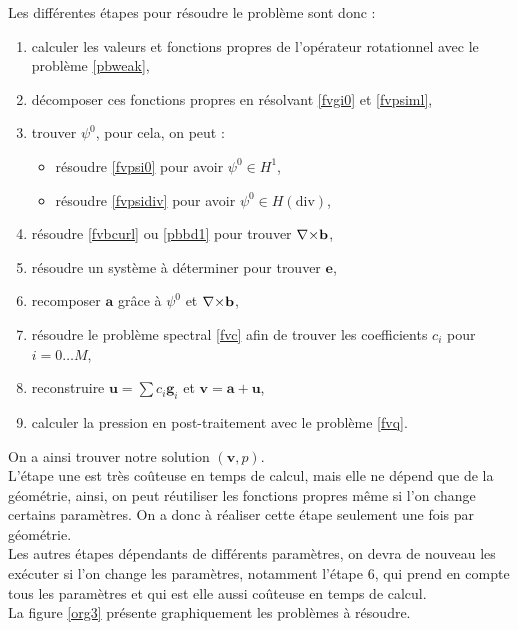 Les différentes étapes pour résoudre le problème sont donc :
\begin{enumerate}
\item calculer les valeurs et fonctions propres de l'opérateur rotationnel avec le problème \ref{pbweak},
\item décomposer ces fonctions propres en résolvant \ref{fvgi0} et \ref{fvpsiml},
\item trouver $\psi^0$, pour cela, on peut :
  \begin{itemize}
  \item résoudre \ref{fvpsi0} pour avoir $\psi^0\in H^1$,
  \item résoudre \ref{fvpsidiv} pour avoir $\psi^0\in H(\mathrm{div})$,
  \end{itemize}
\item résoudre \ref{fvbcurl} ou \ref{pbbd1} pour trouver ${\nabla\times}\mathbf{b}$,
\item résoudre un système à déterminer pour trouver $\mathbf{e}$,
\item recomposer $\mathbf{a}$ grâce à $\psi^0$ et ${\nabla\times}\mathbf{b}$,
\item résoudre le problème spectral \ref{fvc} afin de trouver les coefficients $c_i$ pour $i=0\dots M$,
\item reconstruire $\mathbf{u}=\sum c_i \mathbf{g}_i$ et $\mathbf{v}=\mathbf{a}+\mathbf{u}$,
\item calculer la pression en post-traitement avec le problème \ref{fvq}.
\end{enumerate}

On a ainsi trouver notre solution $(\mathbf{v},p)$.\\
L'étape une est très coûteuse en temps de calcul, mais elle ne dépend que de la géométrie, ainsi, on peut réutiliser les fonctions propres même si l'on change certains paramètres. On a donc à réaliser cette étape seulement une fois par géométrie.\\
Les autres étapes dépendants de différents paramètres, on devra de nouveau les exécuter si l'on change les paramètres, notamment l'étape 6, qui prend en compte tous les paramètres et qui est elle aussi coûteuse en temps de calcul.\\

La figure \ref{org3} présente graphiquement les problèmes à résoudre.\\

